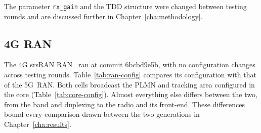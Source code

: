 The parameter \texttt{rx\_gain} and the \gls{TDD} structure were changed between testing rounds and are discussed further in Chapter~\ref{cha:methodology}.

\subsection{4G RAN}
\label{sec:ran-4g}

The 4G srsRAN \gls{RAN}~\cite{srsran_4g_repo} ran at commit 6bcbd9e5b, with no configuration changes across testing rounds. Table~\ref{tab:ran-config} compares its configuration with that of the 5G~\gls{RAN}. Both cells broadcast the \gls{PLMN} and tracking area configured in the core (Table~\ref{tab:core-config}). Almost everything else differs between the two, from the band and duplexing to the radio and its front-end. These differences bound every comparison drawn between the two generations in Chapter~\ref{cha:results}.

